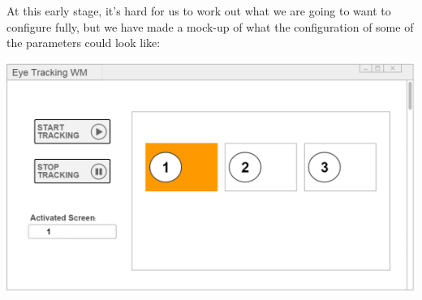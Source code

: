 \documentclass{article}
\begin{document}
\clearpage
At this early stage, it’s hard for us to work out what we are going to want to configure fully, but we have made a mock-up of what the configuration of some of the parameters could look like: \\[1mm]

{\centering
\includegraphics[scale=0.7]{ui.png}\par
}
\end{document}
